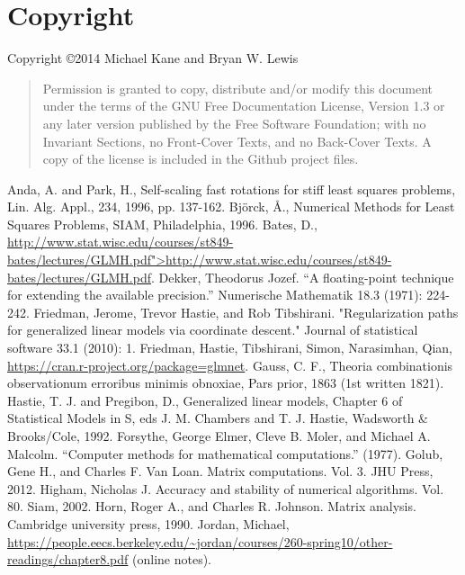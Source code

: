 \documentclass[10pt]{article} %
\begin{document}
\section*{Copyright}
Copyright \copyright  2014 Michael Kane and Bryan W. Lewis

\begin{quote}
    Permission is granted to copy, distribute and/or modify this document
    under the terms of the GNU Free Documentation License, Version 1.3
    or any later version published by the Free Software Foundation;
    with no Invariant Sections, no Front-Cover Texts, and no Back-Cover Texts.
    A copy of the license is included in the Github project files.
\end{quote}



\begin{thebibliography}{99}
 Anda, A. and Park, H., Self-scaling fast rotations for stiff least squares problems, Lin. Alg. Appl., 234, 1996, pp. 137-162.
 Bj\"orck, \AA.,  Numerical Methods for Least Squares Problems, SIAM, Philadelphia, 1996.
 Bates, D., \url{http://www.stat.wisc.edu/courses/st849-bates/lectures/GLMH.pdf">http://www.stat.wisc.edu/courses/st849-bates/lectures/GLMH.pdf}.
Dekker, Theodorus Jozef. ``A floating-point technique for extending the available precision.'' Numerische Mathematik 18.3 (1971): 224-242.
 Friedman, Jerome, Trevor Hastie, and Rob Tibshirani. "Regularization paths for generalized linear models via coordinate descent." Journal of statistical software 33.1 (2010): 1.
 Friedman, Hastie, Tibshirani, Simon, Narasimhan, Qian, \url{https://cran.r-project.org/package=glmnet}.
 Gauss, C. F., Theoria combinationis observationum erroribus minimis obnoxiae, Pars prior, 1863 (1st written 1821).
 Hastie, T. J. and Pregibon, D., Generalized linear models, Chapter 6 of Statistical Models in S, eds J. M. Chambers and T.  J. Hastie, Wadsworth \& Brooks/Cole, 1992.
 Forsythe, George Elmer, Cleve B. Moler, and Michael A. Malcolm. ``Computer methods for mathematical computations.'' (1977).
 Golub, Gene H., and Charles F. Van Loan. Matrix computations. Vol. 3. JHU Press, 2012.
 Higham, Nicholas J. Accuracy and stability of numerical algorithms. Vol. 80. Siam, 2002.
 Horn, Roger A., and Charles R. Johnson. Matrix analysis. Cambridge university press, 1990.
 Jordan, Michael, \url{https://people.eecs.berkeley.edu/~jordan/courses/260-spring10/other-readings/chapter8.pdf} (online notes).

\end{thebibliography}
\end{document}
